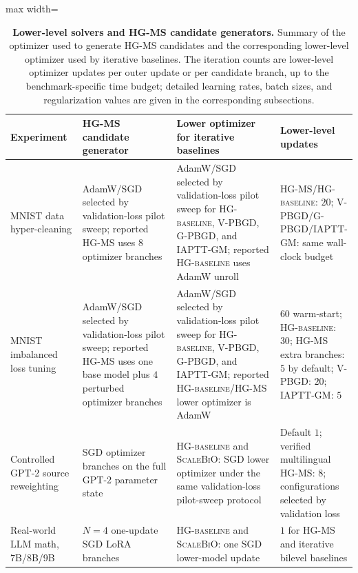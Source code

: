 \documentclass{article}
\theoremstyle{normaltheorem}
\begin{document}
\begin{table}[t]
  \centering
  \caption{\textbf{Lower-level solvers and \textsc{HG-MS} candidate generators.}
  Summary of the optimizer used to generate \textsc{HG-MS} candidates and the corresponding lower-level optimizer used by
  iterative baselines. The iteration counts are lower-level optimizer updates per outer update or per candidate branch,
  up to the benchmark-specific time budget; detailed learning rates, batch sizes, and regularization values are given in
  the corresponding subsections.}
  \label{tab:lower-solver-summary}
  \begin{adjustbox}{max width=\linewidth}
  \begin{tabular}{p{0.21\linewidth}p{0.29\linewidth}p{0.31\linewidth}p{0.19\linewidth}}
    \toprule
    Experiment & \textsc{HG-MS} candidate generator & Lower optimizer for iterative baselines & Lower-level updates \\
    \midrule
    MNIST data hyper-cleaning
    & AdamW/SGD selected by validation-loss pilot sweep; reported \textsc{HG-MS} uses \(8\) optimizer branches
    & AdamW/SGD selected by validation-loss pilot sweep for \textsc{HG-baseline}, V-PBGD, G-PBGD, and IAPTT-GM; reported \textsc{HG-baseline} uses AdamW unroll
    & \textsc{HG-MS}/\textsc{HG-baseline}: \(20\); V-PBGD/G-PBGD/IAPTT-GM: same wall-clock budget \\
    \addlinespace
    MNIST imbalanced loss tuning
    & AdamW/SGD selected by validation-loss pilot sweep; reported \textsc{HG-MS} uses one base model plus \(4\) perturbed optimizer branches
    & AdamW/SGD selected by validation-loss pilot sweep for \textsc{HG-baseline}, V-PBGD, G-PBGD, and IAPTT-GM; reported \textsc{HG-baseline}/\textsc{HG-MS} lower optimizer is AdamW
    & \(60\) warm-start; \textsc{HG-baseline}: \(30\); \textsc{HG-MS} extra branches: \(5\) by default; V-PBGD: \(20\); IAPTT-GM: \(5\) \\
    \addlinespace
    Controlled GPT-2 source reweighting
    & SGD optimizer branches on the full GPT-2 parameter state
    & \textsc{HG-baseline} and \textsc{ScaleBiO}: SGD lower optimizer under the same validation-loss pilot-sweep protocol
    & Default \(1\); verified multilingual \textsc{HG-MS}: \(8\); configurations selected by validation loss \\
    \addlinespace
    Real-world LLM math, 7B/8B/9B
    & \(N=4\) one-update SGD LoRA branches
    & \textsc{HG-baseline} and \textsc{ScaleBiO}: one SGD lower-model update
    & \(1\) for \textsc{HG-MS} and iterative bilevel baselines \\

\end{tabular}
\end{adjustbox}
\end{table}
\end{document}
